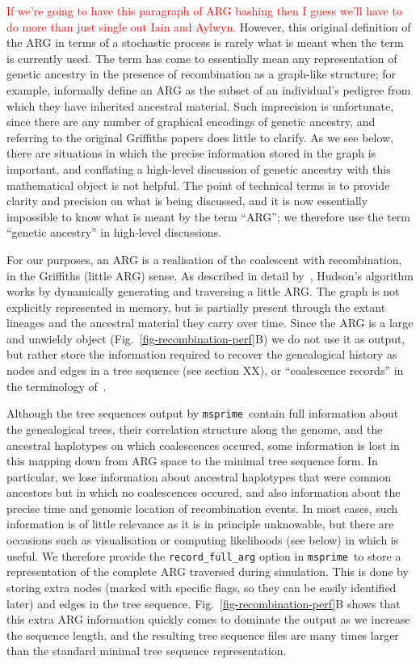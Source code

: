 \documentclass{article}
\newcommand{\msprime}[0]{\texttt{msprime}}
\newcommand{\jkcomment}[1]{\textcolor{red}{#1}}
\begin{document}
\jkcomment{If we're going to have this paragraph of ARG bashing then
I guess we'll have to do more than just single out Iain and Aylwyn.}
However, this original definition of the ARG in terms of a stochastic process
is rarely what is meant when the term is currently used. The term has come to
essentially mean any representation of genetic ancestry in the presence
of recombination as a graph-like structure; for example,
\cite{mathieson2020ancestry} informally define an ARG as the subset of an
individual's pedigree from which they have inherited ancestral material. Such
imprecision is unfortunate, since there are any number of graphical encodings of
genetic ancestry, and referring to the original Griffiths papers does little to
clarify. As we see below, there are situations in which the precise information
stored in the graph is important, and conflating a high-level
discussion of genetic ancestry with this mathematical object is not
helpful. The point of technical terms is to provide clarity and
precision on what is being discussed, and it is now essentially
impossible to know what is meant by the term ``ARG'';
we therefore use the term ``genetic ancestry'' in high-level
discussions.

For our purposes, an ARG is a realisation of the coalescent with
recombination, in the Griffiths (little ARG) sense.
As described in detail by~\cite{kelleher2016efficient}, Hudson's algorithm
works by dynamically generating and traversing a little ARG.
The graph is not explicitly represented in memory, but is partially
present through the extant lineages and the ancestral material they carry
over time. Since the ARG is a large and unwieldy object
(Fig.~\ref{fig-recombination-perf}B) we do not use it as output, but
rather store the information required to recover the genealogical
history as nodes and edges in a tree sequence (see section XX),
or ``coalescence records'' in the terminology of~\citep{kelleher2016efficient}.

Although the tree sequences output by \msprime\ contain full information
about the genealogical trees, their correlation structure along the genome,
and the ancestral haplotypes on which coalescences occured, some information
is lost in this mapping down from ARG space to the minimal tree sequence
form. In particular, we lose
information about ancestral haplotypes that were common ancestors but
in which no coalescences occured, and also information about the precise time
and genomic location of recombination events. In most cases, such
information is of little relevance as it is in principle unknowable,
but there are occasions such as visualisation or computing likelihoods (see
below) in which is useful. We therefore provide
the \texttt{record\_full\_arg} option in \msprime\
to store a representation of the complete ARG traversed during simulation.
This is done by storing extra nodes (marked with specific flags, so they
can be easily identified later) and edges in the tree sequence.
Fig.~\ref{fig-recombination-perf}B shows that this extra ARG information
quickly comes to dominate the output as we increase the sequence length,
and the resulting tree sequence files are many times larger
than the standard minimal tree sequence representation.
\end{document}
